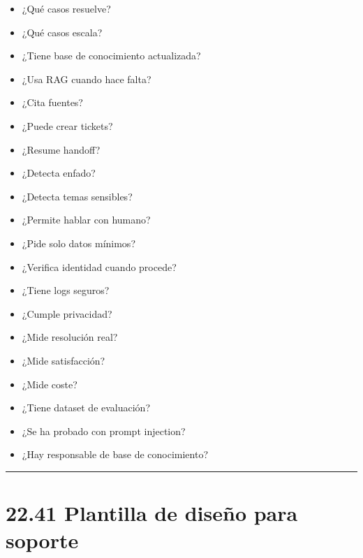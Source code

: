 \begin{itemize}
\tightlist
\item
  ¿Qué casos resuelve?
\item
  ¿Qué casos escala?
\item
  ¿Tiene base de conocimiento actualizada?
\item
  ¿Usa RAG cuando hace falta?
\item
  ¿Cita fuentes?
\item
  ¿Puede crear tickets?
\item
  ¿Resume handoff?
\item
  ¿Detecta enfado?
\item
  ¿Detecta temas sensibles?
\item
  ¿Permite hablar con humano?
\item
  ¿Pide solo datos mínimos?
\item
  ¿Verifica identidad cuando procede?
\item
  ¿Tiene logs seguros?
\item
  ¿Cumple privacidad?
\item
  ¿Mide resolución real?
\item
  ¿Mide satisfacción?
\item
  ¿Mide coste?
\item
  ¿Tiene dataset de evaluación?
\item
  ¿Se ha probado con prompt injection?
\item
  ¿Hay responsable de base de conocimiento?
\end{itemize}

\begin{center}\rule{0.5\linewidth}{0.5pt}\end{center}

\section{22.41 Plantilla de diseño para
soporte}\label{plantilla-de-diseuxf1o-para-soporte}

